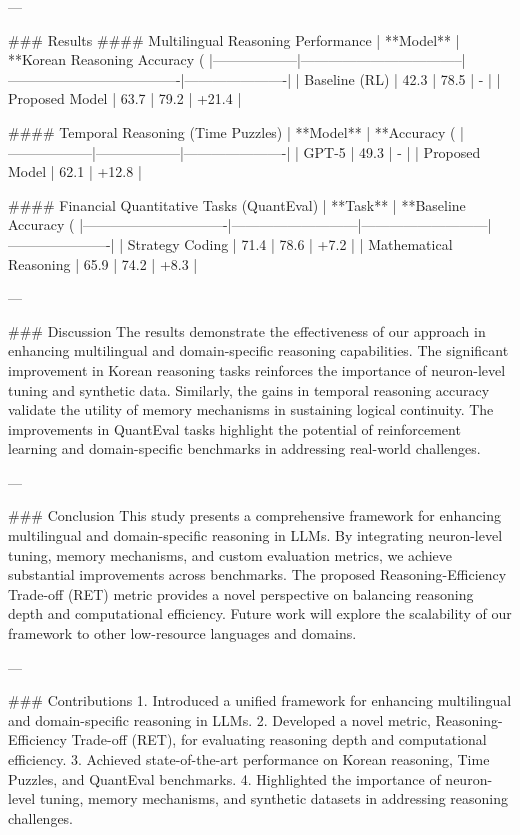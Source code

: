 ---

### Results
#### Multilingual Reasoning Performance
| **Model**       | **Korean Reasoning Accuracy (%
|------------------|-----------------------------------|-------------------------------------|----------------------|
| Baseline (RL)    | 42.3                             | 78.5                               | -                    |
| Proposed Model   | 63.7                             | 79.2                               | +21.4                |

#### Temporal Reasoning (Time Puzzles)
| **Model**       | **Accuracy (%
|------------------|------------------|----------------------|
| GPT-5           | 49.3             | -                    |
| Proposed Model   | 62.1             | +12.8                |

#### Financial Quantitative Tasks (QuantEval)
| **Task**                      | **Baseline Accuracy (%
|-------------------------------|---------------------------|---------------------------|----------------------|
| Strategy Coding               | 71.4                     | 78.6                     | +7.2                 |
| Mathematical Reasoning        | 65.9                     | 74.2                     | +8.3                 |

---

### Discussion
The results demonstrate the effectiveness of our approach in enhancing multilingual and domain-specific reasoning capabilities. The significant improvement in Korean reasoning tasks reinforces the importance of neuron-level tuning and synthetic data. Similarly, the gains in temporal reasoning accuracy validate the utility of memory mechanisms in sustaining logical continuity. The improvements in QuantEval tasks highlight the potential of reinforcement learning and domain-specific benchmarks in addressing real-world challenges.

---

### Conclusion
This study presents a comprehensive framework for enhancing multilingual and domain-specific reasoning in LLMs. By integrating neuron-level tuning, memory mechanisms, and custom evaluation metrics, we achieve substantial improvements across benchmarks. The proposed Reasoning-Efficiency Trade-off (RET) metric provides a novel perspective on balancing reasoning depth and computational efficiency. Future work will explore the scalability of our framework to other low-resource languages and domains.

---

### Contributions
1. Introduced a unified framework for enhancing multilingual and domain-specific reasoning in LLMs.
2. Developed a novel metric, Reasoning-Efficiency Trade-off (RET), for evaluating reasoning depth and computational efficiency.
3. Achieved state-of-the-art performance on Korean reasoning, Time Puzzles, and QuantEval benchmarks.
4. Highlighted the importance of neuron-level tuning, memory mechanisms, and synthetic datasets in addressing reasoning challenges.